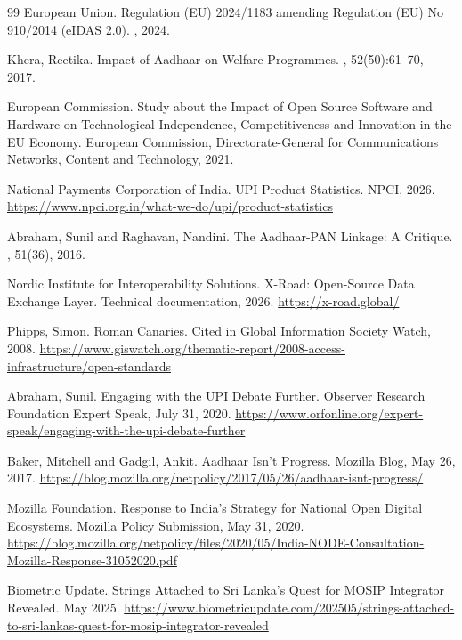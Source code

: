 \documentclass{article}
\begin{document}
\begin{thebibliography}{99}
European Union.
\newblock Regulation (EU) 2024/1183 amending Regulation (EU) No 910/2014 (eIDAS 2.0).
, 2024.

Khera, Reetika.
\newblock Impact of Aadhaar on Welfare Programmes.
, 52(50):61--70, 2017.

European Commission.
\newblock Study about the Impact of Open Source Software and Hardware on Technological Independence, Competitiveness and Innovation in the EU Economy.
\newblock European Commission, Directorate-General for Communications Networks, Content and Technology, 2021.

National Payments Corporation of India.
\newblock UPI Product Statistics.
\newblock NPCI, 2026.
\newblock \url{https://www.npci.org.in/what-we-do/upi/product-statistics}

Abraham, Sunil and Raghavan, Nandini.
\newblock The Aadhaar-PAN Linkage: A Critique.
, 51(36), 2016.

Nordic Institute for Interoperability Solutions.
\newblock X-Road: Open-Source Data Exchange Layer.
\newblock Technical documentation, 2026.
\newblock \url{https://x-road.global/}

Phipps, Simon.
\newblock Roman Canaries.
\newblock Cited in Global Information Society Watch, 2008.
\newblock \url{https://www.giswatch.org/thematic-report/2008-access-infrastructure/open-standards}

Abraham, Sunil.
\newblock Engaging with the UPI Debate Further.
\newblock Observer Research Foundation Expert Speak, July 31, 2020.
\newblock \url{https://www.orfonline.org/expert-speak/engaging-with-the-upi-debate-further}

Baker, Mitchell and Gadgil, Ankit.
\newblock Aadhaar Isn't Progress.
\newblock Mozilla Blog, May 26, 2017.
\newblock \url{https://blog.mozilla.org/netpolicy/2017/05/26/aadhaar-isnt-progress/}

Mozilla Foundation.
\newblock Response to India's Strategy for National Open Digital Ecosystems.
\newblock Mozilla Policy Submission, May 31, 2020.
\newblock \url{https://blog.mozilla.org/netpolicy/files/2020/05/India-NODE-Consultation-Mozilla-Response-31052020.pdf}

Biometric Update.
\newblock Strings Attached to Sri Lanka's Quest for MOSIP Integrator Revealed.
\newblock May 2025.
\newblock \url{https://www.biometricupdate.com/202505/strings-attached-to-sri-lankas-quest-for-mosip-integrator-revealed}

\end{thebibliography}
\end{document}
